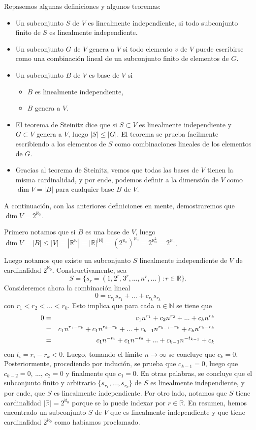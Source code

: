 \documentclass[11pt,spanish]{article}
\newcommand{\NN}{\mathbb{N}}
\newcommand{\RR}{\mathbb{R}}
\begin{document}
\begin{itemize}
Repasemos algunas definiciones y algunos teoremas:
\begin{itemize}
\item Un subconjunto $S$ de $V$ es linealmente independiente, si todo subconjunto finito de $S$ es linealmente independiente.
\item Un subconjunto $G$ de $V$ genera a $V$ si todo elemento $v$ de $V$ puede escribirse como una combinaci\'on lineal de un subconjunto finito de elementos de $G$.
\item Un subconjunto $B$ de $V$ es base de $V$ si
\begin{itemize}
\item $B$ es linealmente independiente,
\item $B$ genera a $V$.
\end{itemize}
\item El teorema de Steinitz dice que si $S\subset V$ es linealmente independiente y $G\subset V$ genera a $V$, luego $|S|\leq |G|$.
El teorema se prueba facilmente escribiendo a los elementos de $S$ como combinaciones lineales de los elementos de $G$.
\item Gracias al teorema de Steinitz, vemos que todas las bases de $V$ tienen la misma cardinalidad, y por ende, podemos definir a la dimensi\'on de $V$ como $\dim V=|B|$ para cualquier base $B$ de $V$.
\end{itemize}

A continuaci\'on, con las anteriores definiciones en mente, demostraremos que $\dim V=2^{\aleph_0}$.

Primero notamos que si $B$ es una base de $V$, luego $\dim V = |B| \leq |V|=|\RR^{\NN}|=|\RR|^{|\NN|}=(2^{\aleph_0})^{\aleph_0}=2^{\aleph_0^2}=2^{\aleph_0}$.

Luego notamos que existe un subconjunto $S$ linealmente independiente de $V$ de cardinalidad $2^{\aleph_0}$.
Constructivamente, sea 
$$
S=\{s_r=(1,2^r,3^r,...,n^r,...):r\in \RR\}.
$$
Consideremos ahora la combinaci\'on lineal
$$
0
=
c_{r_1} s_{r_1} + ... + c_{r_k} s_{r_k}
$$
con $r_1 < r_2 < ... < r_k$.
Esto implica que para cada $n\in \NN$ se tiene que
\begin{eqnarray}
0 
&=&
c_1 n^{r_1}
+
c_2 n^{r_2}
+
...
+
c_k n^{r_k}
\notag
\\
&=&
c_1 n^{r_1-r_k}
+
c_1 n^{r_2-r_k}
+
...
+
c_{k-1} n^{r_{k-1}-r_k}
+
c_k n^{r_k-r_k}
\notag
\\
&=&
c_1 n^{-t_1}
+
c_1 n^{-t_2}
+
...
+
c_{k-1} n^{-t_{k-1}}
+
c_k
\notag
\end{eqnarray}
con $t_i = r_i - r_k < 0$.
Luego, tomando el l\'imite $n\to \infty$ se concluye que $c_k=0$.
Posteriormente, procediendo por induci\'on, se prueba que $c_{k-1}=0$, luego que $c_{k-2}=0$, ..., $c_2=0$ y finalmente que $c_1=0$.
En otras palabras, se concluye que el subconjunto finito y arbitrario $\{s_{r_1},...,s_{r_k}\}$ de $S$ es linealmente independiente, y por ende, que $S$ es linealmente independiente.
Por otro lado, notamos que $S$ tiene cardinalidad $|\RR|=2^{\aleph_0}$ porque se lo puede indexar por $r\in \RR$.
En resumen, hemos encontrado un subconjunto $S$ de $V$ que es linealmente independiente y que tiene cardinalidad $2^{\aleph_0}$ como hab\'iamos proclamado.


\end{itemize}
\end{document}
